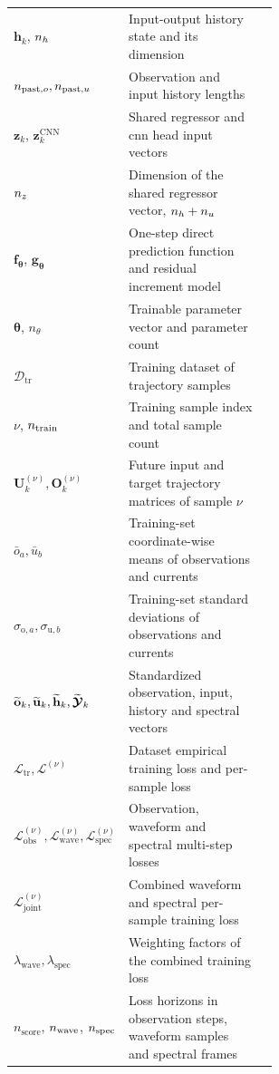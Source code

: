\begin{longtable}{@{}lp{0.58\linewidth}l@{}}
    $\mathbf{h}_k$, $n_{h}$ & Input-output history state and its dimension & \textendash{} \\
    $n_{\mathrm{past},o}, n_{\mathrm{past},u}$ & Observation and input history lengths & \textendash{} \\
    $\mathbf z_k$, $\mathbf z_k^{\mathrm{CNN}}$ & Shared regressor and \acs*{cnn} head input vectors & \textendash{} \\
    $n_{z}$ & Dimension of the shared regressor vector, $n_{h}+n_{u}$ & \textendash{} \\
    $\mathbf{f}_{\boldsymbol{\theta}}$, $\mathbf{g}_{\boldsymbol{\theta}}$ & One-step direct prediction function and residual increment model & \textendash{} \\
    $\boldsymbol{\theta}$, $n_\theta$ & Trainable parameter vector and parameter count & \textendash{} \\
    $\mathcal{D}_{\mathrm{tr}}$ & Training dataset of trajectory samples & \textendash{} \\
    $\nu$, $n_{\mathrm{train}}$ & Training sample index and total sample count & \textendash{} \\
    $\mathbf{U}^{(\nu)}_k, \mathbf{O}^{(\nu)}_k$ & Future input and target trajectory matrices of sample $\nu$ & \textendash{} \\
    $\bar{o}_a, \bar{u}_b$ & Training-set coordinate-wise means of observations and currents & \textendash{} \\
    $\sigma_{\mathrm{o},a}, \sigma_{\mathrm{u},b}$ & Training-set standard deviations of observations and currents & \textendash{} \\
    $\widetilde{\mathbf{o}}_k, \widetilde{\mathbf{u}}_k, \widetilde{\mathbf{h}}_k, \widetilde{\boldsymbol{\mathcal{Y}}}_k$ & Standardized observation, input, history and spectral vectors & \textendash{} \\
    $\mathcal L_\mathrm{tr}, \mathcal L^{(\nu)}$ & Dataset empirical training loss and per-sample loss & \textendash{} \\
    $\mathcal L_\mathrm{obs}^{(\nu)}, \mathcal L_\mathrm{wave}^{(\nu)}, \mathcal L_\mathrm{spec}^{(\nu)}$ & Observation, waveform and spectral multi-step losses & \textendash{} \\
    $\mathcal L_\mathrm{joint}^{(\nu)}$ & Combined waveform and spectral per-sample training loss & \textendash{} \\
    $\lambda_\mathrm{wave}, \lambda_\mathrm{spec}$ & Weighting factors of the combined training loss & \textendash{} \\
    $n_{\mathrm{score}}$, $n_{\mathrm{wave}}$, $n_{\mathrm{spec}}$ & Loss horizons in observation steps, waveform samples and spectral frames & \textendash{} \\

\end{longtable}
